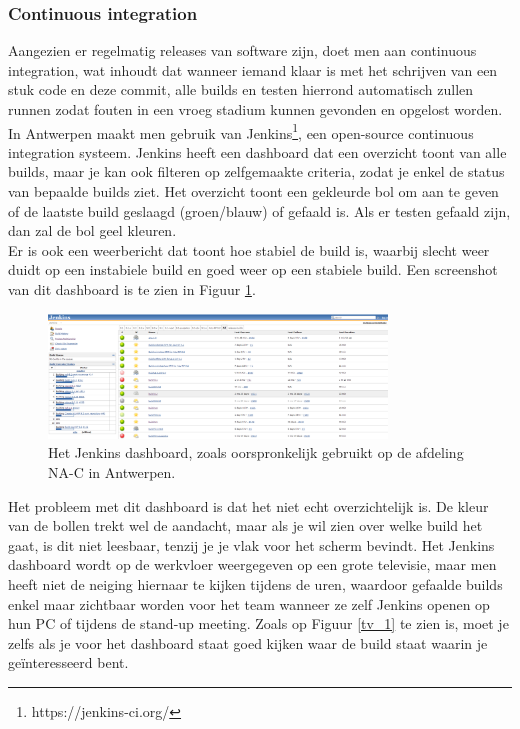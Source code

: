 \documentclass[10pt,a4paper]{article}
\begin{document}
\subsubsection{Continuous integration}
Aangezien er regelmatig releases van software zijn, doet men aan continuous integration, wat inhoudt dat wanneer iemand klaar is met het schrijven van een stuk code en deze commit, alle builds en testen hierrond automatisch zullen runnen zodat fouten in een vroeg stadium kunnen gevonden en opgelost worden.\\
In Antwerpen maakt men gebruik van Jenkins\footnote{https://jenkins-ci.org/}, een open-source continuous integration systeem. Jenkins heeft een dashboard dat een overzicht toont van alle builds, maar je kan ook filteren op zelfgemaakte criteria, zodat je enkel de status van bepaalde builds ziet. Het overzicht toont een gekleurde bol om aan te geven of de laatste build geslaagd (groen/blauw) of gefaald is. Als er testen gefaald zijn, dan zal de bol geel kleuren.\\
Er is ook een weerbericht dat toont hoe stabiel de build is, waarbij slecht weer duidt op een instabiele build en goed weer op een stabiele build. Een screenshot van dit dashboard is te zien in Figuur \ref{jenkins}.

\begin{figure}[ht!]
\centering
\includegraphics[width=90mm]{CaptureJenkins.png}
\caption{Het Jenkins dashboard, zoals oorspronkelijk gebruikt op de afdeling NA-C in Antwerpen.} 
\label{jenkins}
\end{figure}

Het probleem met dit dashboard is dat het niet echt overzichtelijk is. De kleur van de bollen trekt wel de aandacht, maar als je wil zien over welke build het gaat, is dit niet leesbaar, tenzij je je vlak voor het scherm bevindt. Het Jenkins dashboard wordt op de werkvloer weergegeven op een grote televisie, maar men heeft niet de neiging hiernaar te kijken tijdens de uren, waardoor gefaalde builds enkel maar zichtbaar worden voor het team wanneer ze zelf Jenkins openen op hun PC of tijdens de stand-up meeting. Zoals op Figuur \ref{tv_1} te zien is, moet je zelfs als je voor het dashboard staat goed kijken waar de build staat waarin je ge\"interesseerd bent.
\end{document}
